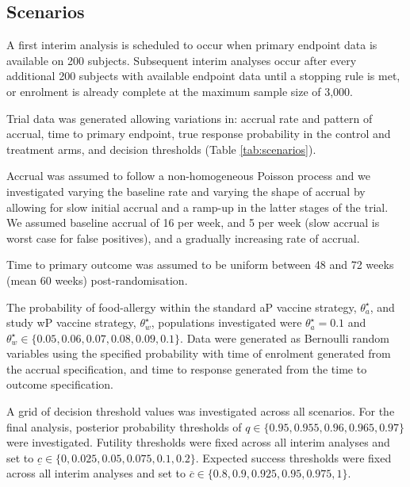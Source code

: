 \documentclass{bmcart}
\begin{document}
\subsection*{Scenarios}

A first interim analysis is scheduled to occur when primary endpoint data is available on 200 subjects.
Subsequent interim analyses occur after every additional 200 subjects with available endpoint data until a stopping rule is met, or enrolment is already complete at the maximum sample size of 3,000.

Trial data was generated allowing variations in: accrual rate and pattern of accrual, time to primary endpoint, true response probability in the control and treatment arms, and decision thresholds (Table \ref{tab:scenarios}).

Accrual was assumed to follow a non-homogeneous Poisson process and we investigated varying the baseline rate and varying the shape of accrual by allowing for slow initial accrual and a ramp-up in the latter stages of the trial.
We assumed baseline accrual of 16 per week, and 5 per week (slow accrual is worst case for false positives), and a gradually increasing rate of accrual.

Time to primary outcome was assumed to be uniform between 48 and 72 weeks (mean 60 weeks) post-randomisation.

The probability of food-allergy within the standard aP vaccine strategy, $\theta_a^\star$, and study wP vaccine strategy, $\theta_w^\star$, populations investigated were $\theta_a^\star=0.1$ and $\theta_w^\star\in\{0.05, 0.06, 0.07, 0.08, 0.09,0.1\}$.
Data were generated as Bernoulli random variables using the specified probability with time of enrolment generated from the accrual specification, and time to response generated from the time to outcome specification.

A grid of decision threshold values was investigated across all scenarios.
For the final analysis, posterior probability thresholds of $q\in\{0.95,0.955,0.96,0.965,0.97\}$ were investigated.
Futility thresholds were fixed across all interim analyses and set to $\underline{c}\in\{0,0.025,0.05,0.075,0.1,0.2\}$.
Expected success thresholds were fixed across all interim analyses and set to $\overline{c}\in\{0.8,0.9,0.925,0.95,0.975,1\}$.
\end{document}
